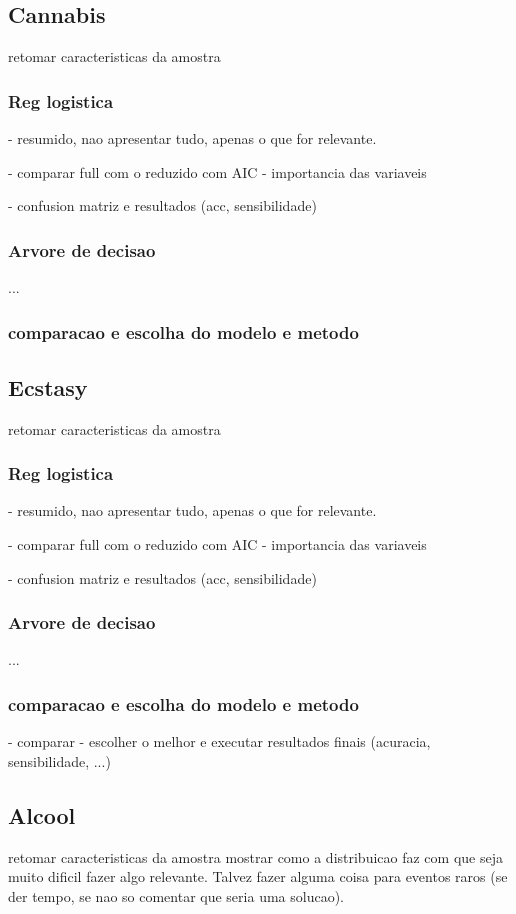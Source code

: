 \documentclass[
	article,			%
	11pt,				%
	oneside,			%
	a4paper,			%
	english,			%
	brazil,				%
	sumario=tradicional
	]{abntex2}
\begin{document}
\subsection{Cannabis}
retomar caracteristicas da amostra
\subsubsection{Reg logistica}

- resumido, nao apresentar tudo, apenas o que for relevante.

- comparar full com o reduzido com AIC
- importancia das variaveis

- confusion matriz e resultados (acc, sensibilidade)
\subsubsection{Arvore de decisao}
... 

\subsubsection{comparacao e escolha do modelo e metodo}

\subsection{Ecstasy}
retomar caracteristicas da amostra
\subsubsection{Reg logistica}

- resumido, nao apresentar tudo, apenas o que for relevante.

- comparar full com o reduzido com AIC
- importancia das variaveis

- confusion matriz e resultados (acc, sensibilidade)
\subsubsection{Arvore de decisao}
... 

\subsubsection{comparacao e escolha do modelo e metodo}

- comparar
- escolher o melhor e executar resultados finais (acuracia, sensibilidade, ...)

\subsection{Alcool}
retomar caracteristicas da amostra
mostrar como a distribuicao faz com que seja muito dificil fazer algo relevante.
Talvez fazer alguma coisa para eventos raros (se der tempo, se nao so comentar que seria uma solucao).
\end{document}
